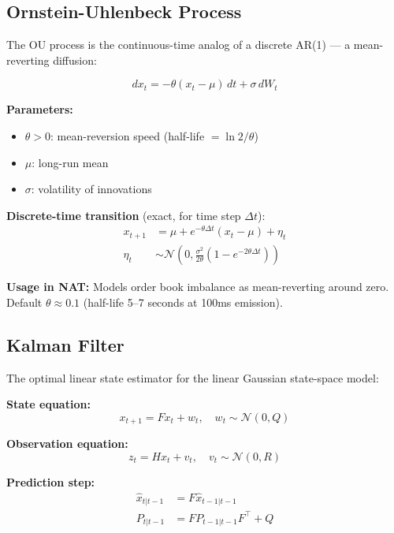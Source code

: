\documentclass[11pt,a4paper]{article}
\begin{document}
\subsection{Ornstein-Uhlenbeck Process}

The OU process is the continuous-time analog of a discrete AR(1) --- a mean-reverting diffusion:

\begin{equation}
dx_t = -\theta(x_t - \mu)\,dt + \sigma\,dW_t
\end{equation}

\textbf{Parameters:}
\begin{itemize}
    \item $\theta > 0$: mean-reversion speed (half-life $= \ln 2 / \theta$)
    \item $\mu$: long-run mean
    \item $\sigma$: volatility of innovations
\end{itemize}

\textbf{Discrete-time transition} (exact, for time step $\Delta t$):
\begin{align}
x_{t+1} &= \mu + e^{-\theta \Delta t}(x_t - \mu) + \eta_t \\
\eta_t &\sim \mathcal{N}\left(0, \frac{\sigma^2}{2\theta}(1 - e^{-2\theta \Delta t})\right)
\end{align}

\textbf{Usage in NAT:} Models order book imbalance as mean-reverting around zero. Default $\theta \approx 0.1$ (half-life 5--7 seconds at 100ms emission).

\subsection{Kalman Filter}

The optimal linear state estimator for the linear Gaussian state-space model:

\textbf{State equation:}
\begin{equation}
x_{t+1} = F x_t + w_t, \quad w_t \sim \mathcal{N}(0, Q)
\end{equation}

\textbf{Observation equation:}
\begin{equation}
z_t = H x_t + v_t, \quad v_t \sim \mathcal{N}(0, R)
\end{equation}

\textbf{Prediction step:}
\begin{align}
\hat{x}_{t|t-1} &= F \hat{x}_{t-1|t-1} \\
P_{t|t-1} &= F P_{t-1|t-1} F^\top + Q
\end{align}
\end{document}
